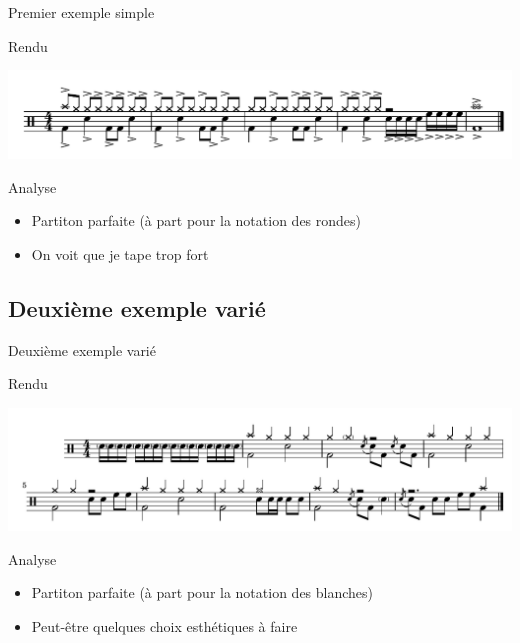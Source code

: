 \documentclass{beamer}
\begin{document}
\begin{frame}{Premier exemple simple}
    \begin{block}{Rendu}
        \begin{center}
            \includegraphics[width=\textwidth]{figures/simple.pdf}
        \end{center}
    \end{block}
    \begin{block}{Analyse}
        \begin{itemize}
            \item Partiton parfaite (à part pour la notation des rondes)
            \item On voit que je tape trop fort
        \end{itemize}
    \end{block}
\end{frame}

\subsection{Deuxième exemple varié}

\begin{frame}{Deuxième exemple varié}
    \begin{block}{Rendu}
        \begin{center}
            \includegraphics[width=\textwidth]{figures/various.pdf}
        \end{center}
    \end{block}
    \begin{block}{Analyse}
        \begin{itemize}
            \item Partiton parfaite (à part pour la notation des blanches)
            \item Peut-être quelques choix esthétiques à faire
        \end{itemize}
    \end{block}
\end{frame}
\end{document}
